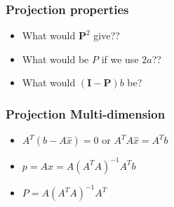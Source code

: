 \documentclass{beamer}
\newtheorem{Key points}{Key points}
\begin{document}
 \begin{frame}
   \frametitle{Projection properties}
   \begin{itemize}
   \item<2-> What would $\mathbf{P}^2$ give??
   \item<3-> What would be $P$ if we use $2a$??
   \item<4-> What would $(\mathbf{I}-\mathbf{P})b$ be?
   \end{itemize}
 \end{frame}
 \begin{frame}
   \frametitle{Projection Multi-dimension}
   \begin{itemize}
   \item<2-> $A^T(b-A\hat{x})=0$ or $A^TA\hat{x}=A^Tb$
\item<3-> $p=A\hat{x}=A(A^TA)^{-1}A^Tb$
\item<4-> $P=A(A^TA)^{-1}A^T$
   \end{itemize}
 \end{frame}
\end{document}
